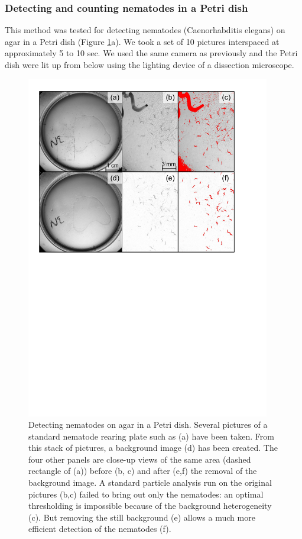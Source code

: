 \subsubsection{Detecting and counting nematodes in a Petri dish}

This method was tested for detecting nematodes (Caenorhabditis elegans) on agar
in a Petri dish (Figure \ref{Fig21-2}a). We took a set of 10 pictures interspaced at
approximately 5 to 10 sec. We used the same camera as previously and the Petri
dish were lit up from below using the lighting device of a dissection
microscope.

\begin{figure}[!ht] %
\centering
\includegraphics[width=0.95\textwidth]{2_Methodo/Fig/2_Nematodes.pdf} 
\caption[ Detecting nematodes on agar in a Petri dish]{
Detecting nematodes on agar in a Petri dish. Several pictures of a standard
nematode rearing plate such as (a) have been taken. From this stack of pictures,
a background image (d) has been created. The four other panels are close-up
views of the same area (dashed rectangle of (a)) before (b, c) and after (e,f)
the removal of the background image. A standard particle analysis run on the
original pictures (b,c) failed to bring out only the nematodes: an optimal
thresholding is impossible because of the background heterogeneity (c). But
removing the still background (e) allows a much more efficient detection of the
nematodes (f).}
\label{Fig21-2}
\end{figure}

